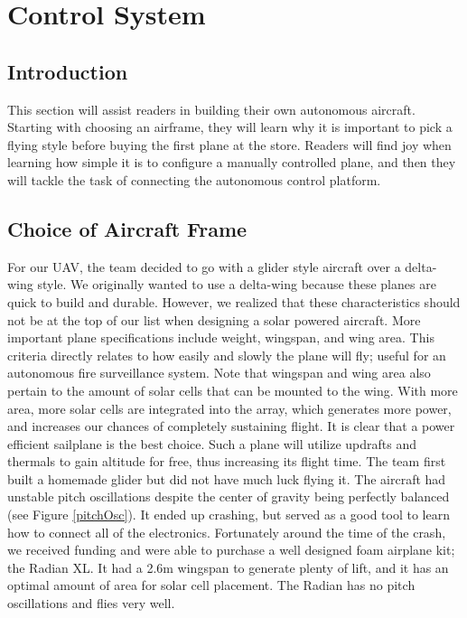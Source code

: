 \documentclass[12pt,journal,compsoc]{IEEEtran}
\begin{document}
\section{Control System}
\subsection{Introduction}
This section will assist readers in building their own autonomous aircraft. Starting with choosing an airframe, they will learn why it is important to pick a flying style before buying the first plane at the store. Readers will find joy when learning how simple it is to configure a manually controlled plane, and then they will tackle the task of connecting the autonomous control platform.

\subsection{Choice of Aircraft Frame}
For our UAV, the team decided to go with a glider style aircraft over a delta-wing style. We originally wanted to use a delta-wing because these planes are quick to build and durable. However, we realized that these characteristics should not be at the top of our list when designing a solar powered aircraft. More important plane specifications include weight, wingspan, and wing area. This criteria directly relates to how easily and slowly the plane will fly; useful for an autonomous fire surveillance system. Note that wingspan and wing area also pertain to the amount of solar cells that can be mounted to the wing. With more area, more solar cells are integrated into the array, which generates more power, and increases our chances of completely sustaining flight. It is clear that a power efficient sailplane is the best choice. Such a plane will utilize updrafts and thermals to gain altitude for free, thus increasing its flight time. The team first built a homemade glider but did not have much luck flying it. The aircraft had unstable pitch oscillations despite the center of gravity being perfectly balanced (see Figure \ref{pitchOsc}). It ended up crashing, but served as a good tool to learn how to connect all of the electronics. Fortunately around the time of the crash, we received funding and were able to purchase a well designed foam airplane kit; the Radian XL. It had a 2.6m wingspan to generate plenty of lift, and it has an optimal amount of area for solar cell placement. The Radian has no pitch oscillations and flies very well.
\end{document}
